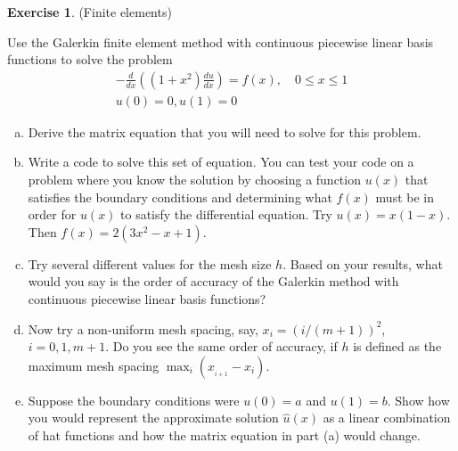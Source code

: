 \documentclass[12pt]{article}
\theoremstyle{definition}
\newtheorem{exer}{Exercise}
\theoremstyle{remark}
\begin{document}
\begin{exer}(Finite elements)

  Use the Galerkin finite element method with continuous piecewise linear basis functions to solve the problem
  \begin{align}
    - \frac{d}{dx} \left( (1 + x^{2}) \frac{du}{dx}\right) = f(x), \quad 0 \leq x \leq 1\\
    u(0) = 0, u(1) = 0
  \end{align}

  \begin{enumerate}[(a)]
    \item Derive the matrix equation that you will need to solve for this problem.
    \item Write a code to solve this set of equation. You can test your code on a problem where you know the solution by choosing a function $u(x)$ that satisfies the boundary conditions and determining what $f(x)$ must be in order for $u(x)$ to satisfy the differential equation. Try $u(x) = x(1-x)$. Then $f(x) = 2 (3x^{2} - x + 1)$.
    \item Try several different values for the mesh size $h$. Based on your results, what would you say is the order of accuracy of the Galerkin method with continuous piecewise linear basis functions?
    \item Now try a non-uniform mesh spacing, say, $x_{i} = (i/(m+1))^{2}$, $i = 0, 1, m+1$. Do you see the same order of accuracy, if $h$ is defined as the maximum mesh spacing $\max_{i} (x_{_{i+1}} - x_{i})$.
          \item Suppose the boundary conditions were $u(0) = a$ and $u(1) = b$. Show how you would represent the approximate solution $\hat{u}(x)$ as a linear combination of hat functions and how the matrix equation in part (a) would change.
  \end{enumerate}
\end{exer}
\end{document}
